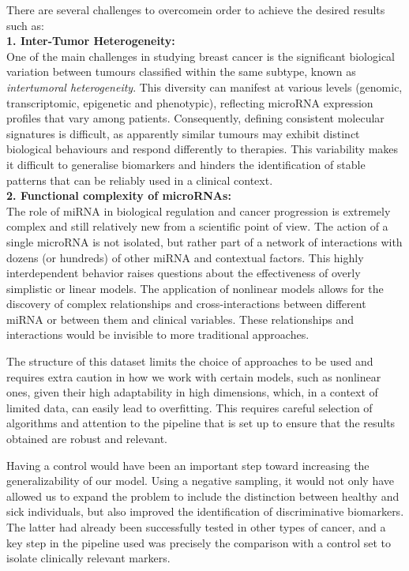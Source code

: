 There are several challenges to overcomein order to achieve the desired results such as: \\ \textbf{1. Inter-Tumor
  Heterogeneity:} \\ One of the main challenges in studying breast cancer is the
significant biological variation between tumours classified within the same
subtype, known as \textit{intertumoral heterogeneity}. This diversity can
manifest at various levels (genomic, transcriptomic, epigenetic and
phenotypic), reflecting microRNA expression profiles that vary among patients.
Consequently, defining consistent molecular signatures is difficult, as
apparently similar tumours may exhibit distinct biological behaviours and
respond differently to therapies. This variability makes it difficult to
generalise biomarkers and hinders the identification of stable patterns that
can be reliably used in a clinical context. \\ \textbf{2. Functional complexity
  of microRNAs:} \label{sec:mirna_complexity} \\ The role of miRNA in
biological regulation and cancer progression is extremely complex and still
relatively new from a scientific point of view. The action of a single microRNA
is not isolated, but rather part of a network of interactions with dozens (or
hundreds) of other miRNA and contextual factors. This highly
interdependent behavior raises questions about the effectiveness of overly
simplistic or linear models. The application of nonlinear models allows for the
discovery of complex relationships and cross-interactions between different
miRNA or between them and clinical variables. These relationships and
interactions would be invisible to more traditional approaches.

The structure of this dataset limits the choice of approaches to be used and
requires extra caution in how we work with certain models, such as nonlinear
ones, given their high adaptability in high dimensions, which, in a context of
limited data, can easily lead to overfitting. This requires careful selection
of algorithms and attention to the pipeline that is set up to ensure that the
results obtained are robust and relevant.

Having a control would have been an important step toward increasing the
generalizability of our model. Using a negative sampling, it would not only
have allowed us to expand the problem to include the distinction between healthy and
sick individuals, but also improved the identification of discriminative
biomarkers. The latter had already been successfully tested in other types of
cancer, and a key step in the pipeline used was precisely the comparison with a
control set \cite{ml_gastric_Azari2023} to isolate clinically relevant markers.

